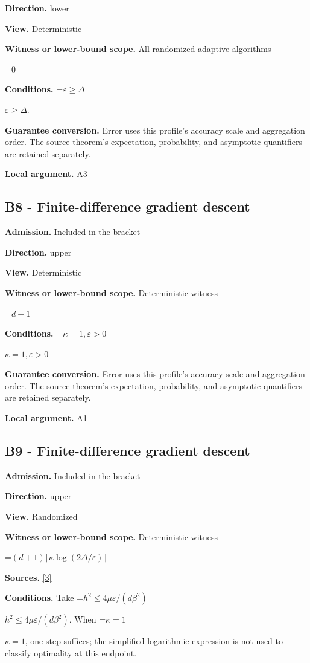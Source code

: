 \documentclass[10pt,a4paper]{article}
\newcommand{\AtlasMath}[1]{\par\begingroup\centering\setbox0=\hbox{$\displaystyle #1$}\ifdim\wd0>1.4\linewidth\typeout{ATLAS WIDE FORMULA: \the\wd0}\fi\ifdim\wd0>\linewidth\resizebox{\linewidth}{!}{\box0}\else\box0\fi\par\endgroup}
\newcommand{\AtlasInlineMath}[1]{\begingroup\setbox0=\hbox{$#1$}\ifdim\wd0>.4\linewidth\endgroup\AtlasMath{#1}\else\endgroup$#1$\fi}
\begin{document}
\textbf{Direction.} lower

\textbf{View.} Deterministic

\textbf{Witness or lower-bound scope.} All randomized adaptive algorithms

\AtlasMath{0}
\textbf{Conditions.} \AtlasInlineMath{\varepsilon\ge\Delta}.

\textbf{Guarantee conversion.} Error uses this profile's accuracy scale and aggregation order. The source theorem's expectation, probability, and asymptotic quantifiers are retained separately.

\textbf{Local argument.} A3

\subsection{B8 - Finite-difference gradient descent}
\textbf{Admission.} Included in the bracket

\textbf{Direction.} upper

\textbf{View.} Deterministic

\textbf{Witness or lower-bound scope.} Deterministic witness

\AtlasMath{d+1}
\textbf{Conditions.} \AtlasInlineMath{\kappa=1,\varepsilon>0}

\textbf{Guarantee conversion.} Error uses this profile's accuracy scale and aggregation order. The source theorem's expectation, probability, and asymptotic quantifiers are retained separately.

\textbf{Local argument.} A1

\subsection{B9 - Finite-difference gradient descent}
\textbf{Admission.} Included in the bracket

\textbf{Direction.} upper

\textbf{View.} Randomized

\textbf{Witness or lower-bound scope.} Deterministic witness

\AtlasMath{(d+1)\lceil\kappa\log(2\Delta/\varepsilon)\rceil}
\textbf{Sources.} \href{https://proceedings.mlr.press/v195/yue23a/yue23a.pdf}{[3]}

\textbf{Conditions.} Take \AtlasInlineMath{h^2\le4\mu\varepsilon/(d\beta ^2)}. When \AtlasInlineMath{\kappa=1}, one step suffices; the simplified logarithmic expression is not used to classify optimality at this endpoint.
\end{document}
